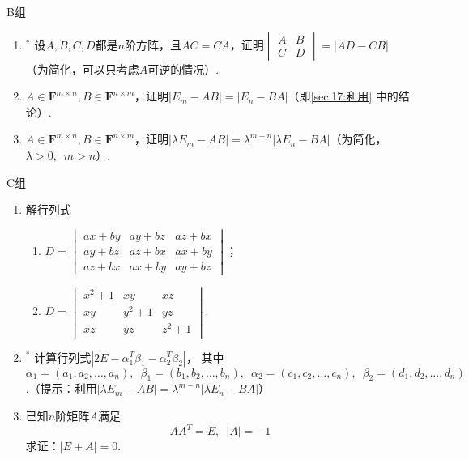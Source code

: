 \centerline{\heiti B组}
\begin{enumerate}
    \item $^*$ 设$A,B,C,D$都是$n$阶方阵，且$AC=CA$，证明$\begin{vmatrix} A&B \\ C&D \end{vmatrix}=|AD-CB|$
    （为简化，可以只考虑$A$可逆的情况）.

    \item $A\in \mathbf{F}^{m\times n}, B\in \mathbf{F}^{n\times m}$，证明$|E_m-AB|=|E_n-BA|$（即\autoref{sec:17:利用} 中的结论）.

    \item $A\in \mathbf{F}^{m\times n}, B\in \mathbf{F}^{n\times m}$，证明$|\lambda E_m-AB|=\lambda^{m-n}|\lambda E_n-BA|$（为简化，$\lambda>0,\enspace m>n$）.
\end{enumerate}
\centerline{\heiti C组}
\begin{enumerate}
    \item 解行列式
    \begin{multicols}{2} \begin{enumerate}[label=(\arabic*)]
        \item $D=\begin{vmatrix}
        ax+by&ay+bz&az+bx\\
        ay+bz&az+bx&ax+by\\
        az+bx&ax+by&ay+bz
        \end{vmatrix}$；

        \item $D=\begin{vmatrix}
        x^2+1&xy&xz\\
        xy&y^2+1&yz\\
        xz&yz&z^2+1
        \end{vmatrix}$.
    \end{enumerate} \end{multicols}

    \item $^*$ 计算行列式$|2E-\alpha_1^T\beta_1-\alpha_2^T\beta_2|$，
    其中$\alpha_1=(a_1,a_2,\ldots,a_n),\enspace \beta_1=(b_1,b_2,\ldots,b_n),\enspace
    \alpha_2=(c_1,c_2,\ldots,c_n),\enspace \beta_2 = (d_1,d_2,\ldots,d_n)$.（提示：利用$|\lambda E_m-AB|=\lambda^{m-n}|\lambda E_n-BA|$）

    \item 已知$n$阶矩阵$A$满足
    \[ AA^T=E,\enspace |A|=-1 \]
    求证：$|E+A|=0$.
\end{enumerate}
